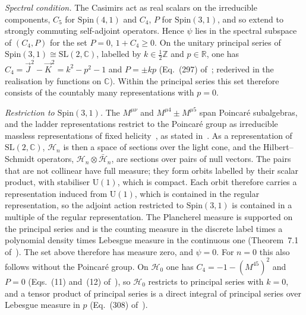 \emph{Spectral condition.} The Casimirs act as real scalars on the irreducible components, \(C_5\) for \(\mathrm{Spin}(4,1)\) and \(C_4\), \(P\) for \(\mathrm{Spin}(3,1)\), and so extend to strongly commuting self-adjoint operators. Hence \(\psi\) lies in the spectral subspace of \((C_4,P)\) for the set \(P=0\), \(1+C_4\ge0\). On the unitary principal series of \(\mathrm{Spin}(3,1)\cong\mathrm{SL}(2,\mathbb C)\), labelled by \(k\in\tfrac12\mathbb Z\) and \(p\in\mathbb R\), one has \(C_4=\vec J^2-\vec K^2=k^2-p^2-1\) and \(P=\pm kp\) (Eq.~(297) of~\cite{MartinDussaud2019}; rederived in the realisation by functions on \(\mathbb C\)). Within the principal series this set therefore consists of the countably many representations with \(p=0\).

\emph{Restriction to \(\mathrm{Spin}(3,1)\).} The \(M^{\mu\nu}\) and \(M^{\mu4}\pm M^{\mu5}\) span Poincar\'e subalgebras, and the ladder representations restrict to the Poincar\'e group as irreducible massless representations of fixed helicity~\cite{MackTodorov1969}, as stated in~\cite{Todorov2019}. As a representation of \(\mathrm{SL}(2,\mathbb C)\), \(\mathcal H_n\) is then a space of sections over the light cone, and the Hilbert--Schmidt operators, \(\mathcal H_n\otimes\bar{\mathcal H}_n\), are sections over pairs of null vectors. The pairs that are not collinear have full measure; they form orbits labelled by their scalar product, with stabiliser \(\mathrm U(1)\), which is compact. Each orbit therefore carries a representation induced from \(\mathrm U(1)\), which is contained in the regular representation, so the adjoint action restricted to \(\mathrm{Spin}(3,1)\) is contained in a multiple of the regular representation. The Plancherel measure is supported on the principal series and is the counting measure in the discrete label times a polynomial density times Lebesgue measure in the continuous one (Theorem~7.1 of~\cite{FioresiYuncken2024}). The set above therefore has measure zero, and \(\psi=0\). For \(n=0\) this also follows without the Poincar\'e group. On \(\mathcal H_0\) one has \(C_4=-1-(M^{45})^2\) and \(P=0\) (Eqs.~(11) and~(12) of~\cite{MantaSteinacker2025}), so \(\mathcal H_0\) restricts to principal series with \(k=0\), and a tensor product of principal series is a direct integral of principal series over Lebesgue measure in \(p\) (Eq.~(308) of~\cite{MartinDussaud2019}).

